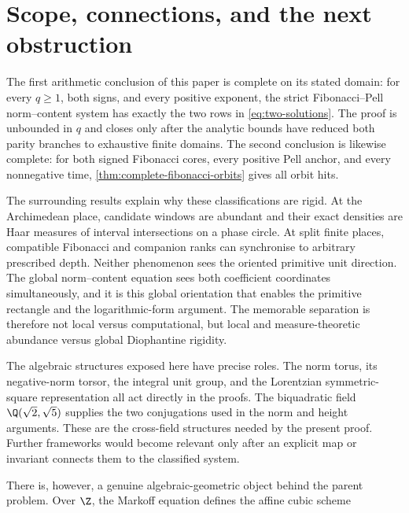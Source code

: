%
%
\section{Scope, connections, and the next obstruction}
\label{sec:outlook}

The first arithmetic conclusion of this paper is complete on its stated
domain: for every $q\geqslant1$, both signs, and every positive exponent,
the strict Fibonacci--Pell norm--content system has exactly the two rows in
\cref{eq:two-solutions}. The proof is unbounded in $q$ and closes only after
the analytic bounds have reduced both parity branches to exhaustive finite
domains. The second conclusion is likewise complete: for both signed
Fibonacci cores, every positive Pell anchor, and every nonnegative time,
\cref{thm:complete-fibonacci-orbits} gives all orbit hits.

The surrounding results explain why these classifications are rigid. At the
Archimedean place, candidate windows are abundant and their exact densities
are Haar measures of interval intersections on a phase circle. At split
finite places, compatible Fibonacci and companion ranks can synchronise to
arbitrary prescribed depth. Neither phenomenon sees the oriented primitive
unit direction. The global norm--content equation sees both coefficient
coordinates simultaneously, and it is this global orientation that enables
the primitive rectangle and the logarithmic-form argument. The memorable
separation is therefore not local versus computational, but local and
measure-theoretic abundance versus global Diophantine rigidity.

The algebraic structures exposed here have precise roles. The norm
torus, its negative-norm torsor, the integral unit group, and the Lorentzian
symmetric-square representation all act directly in the proofs. The
biquadratic field $\Q(\sqrt2,\sqrt5)$ supplies the two conjugations used in
the norm and height arguments. These are the cross-field structures needed
by the present proof. Further frameworks would become relevant only after an
explicit map or invariant connects them to the classified system.

There is, however, a genuine algebraic-geometric object behind the parent
problem. Over $\Z$, the Markoff equation defines the affine cubic scheme

